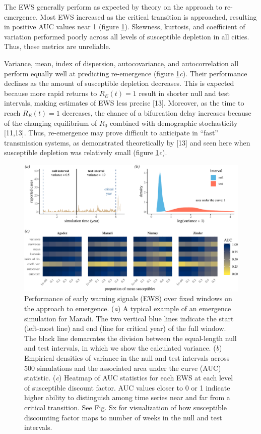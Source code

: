 \documentclass[3p]{elsarticle} %
\makeatletter
\def\maxwidth{\ifdim\Gin@nat@width>\linewidth\linewidth
\else\Gin@nat@width\fi}
\let\Oldincludegraphics\includegraphics
\renewcommand{\includegraphics}[1]{\Oldincludegraphics[width=\maxwidth]{#1}}
\makeatother
\begin{document}
The EWS generally perform as expected by theory on the approach to
re-emergence. Most EWS increased as the critical transition is
approached, resulting in positive AUC values near 1 (figure
\ref{emerge-aucs}). Skewness, kurtosis, and coefficient of variation
performed poorly across all levels of susceptible depletion in all
cities. Thus, these metrics are unreliable.

Variance, mean, index of dispersion, autocovariance, and autocorrelation
all perform equally well at predicting re-emergence (figure
\ref{emerge-aucs}\emph{c}). Their performance declines as the amount of
susceptible depletion decreases. This is expected because more rapid
returns to \(R_E(t)=1\) result in shorter null and test intervals,
making estimates of EWS less precise {[}13{]}. Moreover, as the time to
reach \(R_E(t)=1\) decreases, the chance of a bifurcation delay
increases because of the changing equilibrium of \(R_0\) combined with
demographic stochasticity {[}11,13{]}. Thus, re-emergence may prove
difficult to anticipate in ``fast'' transmission systems, as
demonstrated theoretically by {[}13{]} and seen here when susceptible
depletion was relatively small (figure \ref{emerge-aucs}\emph{c}).

\begin{figure}
\centering
\includegraphics{measles-ews-manuscript_files/figure-latex/emergence-results-1.pdf}
\caption{Performance of early warning signals (EWS) over fixed windows
on the approach to emergence. (\emph{a}) A typical example of an
emergence simulation for Maradi. The two vertical blue lines indicate
the start (left-most line) and end (line for critical year) of the full
window. The black line demarcates the division between the equal-length
null and test intervals, in which we show the calculated variance.
(\emph{b}) Empirical densities of variance in the null and test
intervals across 500 simulations and the associated area under the curve
(AUC) statistic. (\emph{c}) Heatmap of AUC statistics for each EWS at
each level of susceptible discount factor. AUC values closer to 0 or 1
indicate higher ability to distinguish among time series near and far
from a critical transition. See Fig. Sx for visualization of how
susceptible discounting factor maps to number of weeks in the null and
test intervals. \label{emerge-aucs}}
\end{figure}
\end{document}
